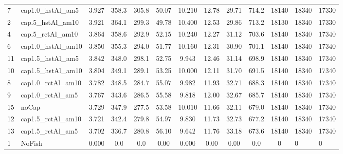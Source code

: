\documentclass[11pt]{book}
\begin{document}
\begin{landscape}
\begin{longtable}[t]{llcccccccccll}
7 & cap1.0\_hstAl\_am5 & 3.927 & 358.3 & 305.8 & 50.07 & 10.210 & 12.78 & 29.71 & 714.2 & 18140 & 18340 & 17330\\
2 & cap.5\_hstAl\_am10 & 3.921 & 364.1 & 299.3 & 49.78 & 10.400 & 12.53 & 29.86 & 713.2 & 18130 & 18340 & 17330\\
4 & cap.5\_rctAl\_am10 & 3.864 & 358.6 & 292.9 & 52.15 & 10.240 & 12.27 & 31.12 & 703.6 & 18140 & 18340 & 17340\\
6 & cap1.0\_hstAl\_am10 & 3.850 & 355.3 & 294.0 & 51.77 & 10.160 & 12.31 & 30.90 & 701.1 & 18140 & 18340 & 17340\\
11 & cap1.5\_hstAl\_am5 & 3.842 & 348.0 & 298.1 & 52.75 & 9.943 & 12.46 & 31.14 & 698.9 & 18140 & 18340 & 17340\\
10 & cap1.5\_hstAl\_am10 & 3.804 & 349.1 & 289.1 & 53.25 & 10.000 & 12.11 & 31.70 & 691.5 & 18140 & 18340 & 17340\\
8 & cap1.0\_rctAl\_am10 & 3.782 & 348.5 & 284.7 & 55.07 & 9.982 & 11.93 & 32.71 & 688.3 & 18140 & 18340 & 17340\\
9 & cap1.0\_rctAl\_am5 & 3.767 & 343.6 & 286.5 & 55.58 & 9.818 & 12.00 & 32.67 & 685.7 & 18140 & 18340 & 17340\\
15 & noCap & 3.729 & 347.9 & 277.5 & 53.58 & 10.010 & 11.66 & 32.11 & 679.0 & 18140 & 18340 & 17340\\
12 & cap1.5\_rctAl\_am10 & 3.721 & 342.4 & 279.8 & 54.97 & 9.830 & 11.73 & 32.73 & 677.2 & 18140 & 18340 & 17340\\
13 & cap1.5\_rctAl\_am5 & 3.702 & 336.7 & 280.8 & 56.10 & 9.642 & 11.76 & 33.18 & 673.6 & 18140 & 18340 & 17340\\
1 & NoFish & 0.000 & 0.0 & 0.0 & 0.00 & 0.000 & 0.00 & 0.00 & 0.0 & 0 & 0 & 0\\*
\end{longtable}
\end{landscape}
\endgroup{}

\newpage
\end{document}
